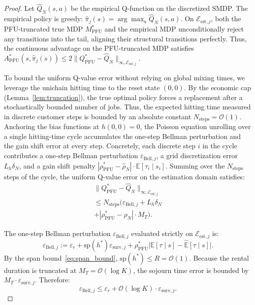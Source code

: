 \documentclass[letterpaper, 10 pt, conference]{IEEEconf}
\newcommand{\E}{\mathbb{E}}
\newcommand{\what}[1]{\widehat{#1}}
\begin{document}
\begin{proof}
    Let $\what{Q}_N(s, a)$ be the empirical Q-function on the discretized SMDP. The empirical policy is greedy: $\what{\pi}_j(s) = \arg\max_a \what{Q}_N(s, a)$. On $\mathcal{E}_{\mathrm{est},j}$, both the PFU-truncated true MDP $M^*_{\mathrm{PFU}}$ and the empirical MDP unconditionally reject any transitions into the tail, aligning their structural transitions perfectly. Thus, the continuous advantage on the PFU-truncated MDP satisfies $A^*_{\mathrm{PFU}}(s, \what{\pi}_j(s)) \le 2 \|Q^*_{\mathrm{PFU}} - \what{Q}_N\|_{\infty, \mathcal{E}_{\mathrm{est},j}}$.

    To bound the uniform Q-value error without relying on global mixing times, we leverage the unichain hitting time to the reset state $(0,0)$. By the economic cap (Lemma~\ref{lem:truncation}), the true optimal policy forces a replacement after a stochastically bounded number of jobs. Thus, the expected hitting time measured in discrete customer steps is bounded by an absolute constant $N_{\mathrm{steps}} = \mathcal{O}(1)$. Anchoring the bias functions at $h(0,0)=0$, the Poisson equation unrolling over a single hitting-time cycle accumulates the one-step Bellman perturbation and the gain shift error at every step. Concretely, each discrete step $i$ in the cycle contributes a one-step Bellman perturbation $\varepsilon_{\mathrm{Bell},j}$, a grid discretization error $L_h \delta_N$, and a gain shift penalty $|\rho^*_{\mathrm{PFU}} - \what{\rho}_N| \cdot \E[\tau_i \mid s_i]$. Summing over the $N_{\mathrm{steps}}$ steps of the cycle, the uniform Q-value error on the estimation domain satisfies:
    \begin{multline}
        \label{eq:Q_error_decomp}
        \|Q^*_{\mathrm{PFU}} - \what{Q}_N\|_{\infty, \mathcal{E}_{\mathrm{est},j}} \\
        \leq N_{\mathrm{steps}} \Big(\varepsilon_{\mathrm{Bell},j} + L_h \delta_N \\
        + |\rho^*_{\mathrm{PFU}} - \what{\rho}_N| \cdot M_T\Big).
    \end{multline}

    The one-step Bellman perturbation $\varepsilon_{\mathrm{Bell},j}$ evaluated strictly on $\mathcal{E}_{\mathrm{est},j}$ is:
    \begin{equation}
        \label{eq:bell_def}
        \varepsilon_{\mathrm{Bell},j} := \varepsilon_r + \mathrm{sp}(h^*) \varepsilon_{\mathrm{surv},j} + \rho^*_{\mathrm{PFU}} \big|\E[\tau \mid s] - \what{\E}[\tau \mid s]\big|.
    \end{equation}
    By the span bound~\eqref{eq:span_bound}, $\mathrm{sp}(h^*) \leq R = \mathcal{O}(1)$. Because the rental duration is truncated at $M_T = \mathcal{O}(\log K)$, the sojourn time error is bounded by $M_T \cdot \varepsilon_{\mathrm{surv},j}$. Therefore:
    \begin{equation}
        \label{eq:bell_bound}
        \varepsilon_{\mathrm{Bell},j} \leq \varepsilon_r + \mathcal{O}(\log K) \cdot \varepsilon_{\mathrm{surv},j}.
    \end{equation}


\end{proof}
\end{document}
